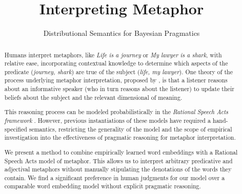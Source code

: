 \documentclass[OpenMind]{stjour}
\begin{document}
\title{Interpreting Metaphor}
\subtitle{Distributional Semantics for Bayesian Pragmatics} %
\author[]
	{}





\begin{abstract}

	Humans interpret metaphors, like \emph{Life is a journey} or \emph{My lawyer is a shark}, with relative ease, incorporating contextual knowledge to determine which aspects of the predicate (\emph{journey, shark}) are true of the subject (\emph{life, my lawyer}). One theory of the process underlying metaphor interpretation, proposed by \citet{grice}, is that a listener reasons about an informative speaker (who in turn reasons about the listener) to update their beliefs about the subject and the relevant dimensional of meaning.

	This reasoning process can be modeled probabilistically in the \emph{Rational Speech Acts framework} \citep{frank2012predicting}.
	However, previous instantiations of these models have required a hand-specified semantics, restricting the generality of the model and the scope of empirical investigation into the effectiveness of pragmatic reasoning for metaphor interpretation.

	We present a method to combine empirically learned word embeddings with a Rational Speech Acts model of metaphor. This allows us to interpret arbitrary predicative and adjectival metaphors without manually stipulating the denotations of the words they contain. We find a significant preference in human judgments for our model over a comparable word embedding model without explicit pragmatic reasoning.


\end{abstract}
\end{document}
